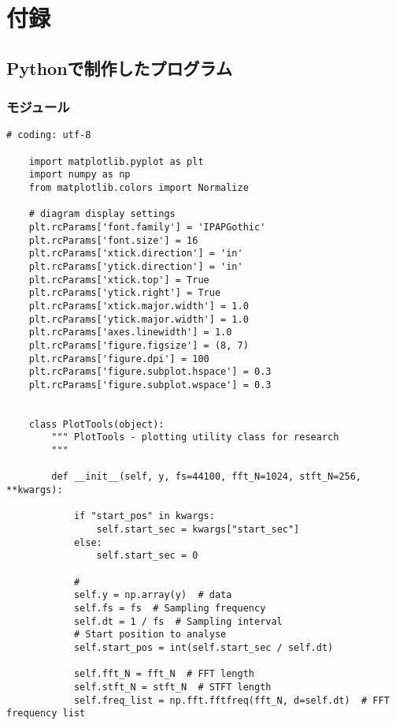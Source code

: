 \appendix

\chapter{付録}

\section{Pythonで制作したプログラム}

\subsection{モジュール}

\begin{lstlisting}[caption=plot\_tools.py,label=plot_tools.py]
    # coding: utf-8

    import matplotlib.pyplot as plt
    import numpy as np
    from matplotlib.colors import Normalize
    
    # diagram display settings
    plt.rcParams['font.family'] = 'IPAPGothic'
    plt.rcParams['font.size'] = 16
    plt.rcParams['xtick.direction'] = 'in'
    plt.rcParams['ytick.direction'] = 'in'
    plt.rcParams['xtick.top'] = True
    plt.rcParams['ytick.right'] = True
    plt.rcParams['xtick.major.width'] = 1.0
    plt.rcParams['ytick.major.width'] = 1.0
    plt.rcParams['axes.linewidth'] = 1.0
    plt.rcParams['figure.figsize'] = (8, 7)
    plt.rcParams['figure.dpi'] = 100
    plt.rcParams['figure.subplot.hspace'] = 0.3
    plt.rcParams['figure.subplot.wspace'] = 0.3
    
    
    class PlotTools(object):
        """ PlotTools - plotting utility class for research
        """
    
        def __init__(self, y, fs=44100, fft_N=1024, stft_N=256, **kwargs):
    
            if "start_pos" in kwargs:
                self.start_sec = kwargs["start_sec"]
            else:
                self.start_sec = 0
    
            #
            self.y = np.array(y)  # data
            self.fs = fs  # Sampling frequency
            self.dt = 1 / fs  # Sampling interval
            # Start position to analyse
            self.start_pos = int(self.start_sec / self.dt)
    
            self.fft_N = fft_N  # FFT length
            self.stft_N = stft_N  # STFT length
            self.freq_list = np.fft.fftfreq(fft_N, d=self.dt)  # FFT frequency list
    

\end{lstlisting}
